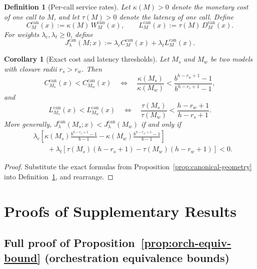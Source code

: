 \documentclass[10pt]{article}
\theoremstyle{paperplain}
\newtheorem{corollary}[theorem]{Corollary}
\theoremstyle{paperdefinition}
\newtheorem{definition}[theorem]{Definition}
\theoremstyle{paperremark}
\begin{document}
\begin{definition}[Per-call service rates]
\label{def:per-call-rates}
Let $\kappa(M)>0$ denote the monetary cost of one call to $M$, and let $\tau(M)>0$ denote the latency of one call.
Define
\[
C_M^{\mathrm{can}}(x):=\kappa(M)\,W_M^{\mathrm{can}}(x),
\qquad
L_M^{\mathrm{can}}(x):=\tau(M)\,D_M^{\mathrm{can}}(x).
\]
For weights $\lambda_c,\lambda_t\ge 0$, define
\[
J_\lambda^{\mathrm{can}}(M;x)
:=
\lambda_c C_M^{\mathrm{can}}(x)+\lambda_t L_M^{\mathrm{can}}(x).
\]
\end{definition}

\begin{corollary}[Exact cost and latency thresholds]
\label{cor:exact-thresholds}
Let $M_s$ and $M_w$ be two models with closure radii $r_s>r_w$.
Then
\[
C_{M_s}^{\mathrm{can}}(x)<C_{M_w}^{\mathrm{can}}(x)
\quad\Longleftrightarrow\quad
\frac{\kappa(M_s)}{\kappa(M_w)}
<
\frac{b^{h-r_w+1}-1}{b^{h-r_s+1}-1},
\]
and
\[
L_{M_s}^{\mathrm{can}}(x)<L_{M_w}^{\mathrm{can}}(x)
\quad\Longleftrightarrow\quad
\frac{\tau(M_s)}{\tau(M_w)}
<
\frac{h-r_w+1}{h-r_s+1}.
\]
More generally, $J_\lambda^{\mathrm{can}}(M_s;x)<J_\lambda^{\mathrm{can}}(M_w)$ if and only if
\[
\begin{aligned}
&\lambda_c\!\left[
\kappa(M_s)\frac{b^{h-r_s+1}-1}{b-1}
-
\kappa(M_w)\frac{b^{h-r_w+1}-1}{b-1}
\right] \\
&\qquad+
\lambda_t\!\left[
\tau(M_s)(h-r_s+1)-\tau(M_w)(h-r_w+1)
\right]
<0.
\end{aligned}
\]
\end{corollary}

\begin{proof}
Substitute the exact formulas from Proposition~\ref{prop:canonical-geometry} into Definition~\ref{def:per-call-rates}, and rearrange.
\end{proof}

\section{Proofs of Supplementary Results}
\label{app:proofs}

\subsection{Full proof of Proposition~\ref{prop:orch-equiv-bound} (orchestration equivalence bounds)}
\end{document}
